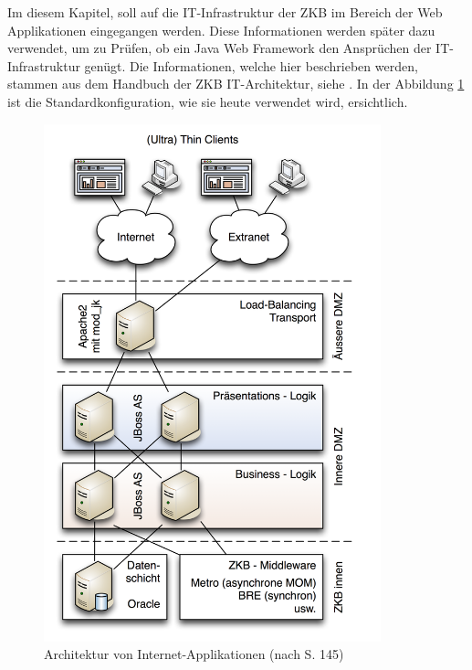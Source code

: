   Im diesem Kapitel, soll auf die IT-Infrastruktur der \ac{ZKB} im Bereich der
  Web Applikationen eingegangen werden. Diese Informationen werden später dazu
  verwendet, um zu Prüfen, ob ein Java Web Framework den Ansprüchen der
  IT-Infrastruktur genügt. Die Informationen, welche hier beschrieben werden,
  stammen aus dem Handbuch der ZKB IT-Architektur, siehe
  \cite{ZkbHandbuchDerItArchitektur}. In der Abbildung
  \ref{img:infrastrukturZkb} ist die Standardkonfiguration, wie sie heute
  verwendet wird, ersichtlich.
  
  \begin{figure}[ht]
    \begin{center}
      \includegraphics[width=0.87\textwidth]{./image/infrastrukturZkb.png}
      \caption{Architektur von Internet-Applikationen (nach
      \cite{ZkbHandbuchDerItArchitektur} S. 145)}
      \label{img:infrastrukturZkb}
    \end{center}
  \end{figure}
  
